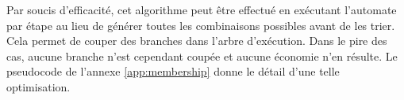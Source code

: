 Par soucis d'efficacité, cet algorithme peut être effectué en exécutant l'automate par étape au lieu de générer toutes les combinaisons possibles avant de les trier. Cela permet de couper des branches dans l'arbre d'exécution. Dans le pire des cas, aucune branche n'est cependant coupée et aucune économie n'en résulte. Le pseudocode de l'annexe \ref{app:membership} donne le détail d'une telle optimisation.
